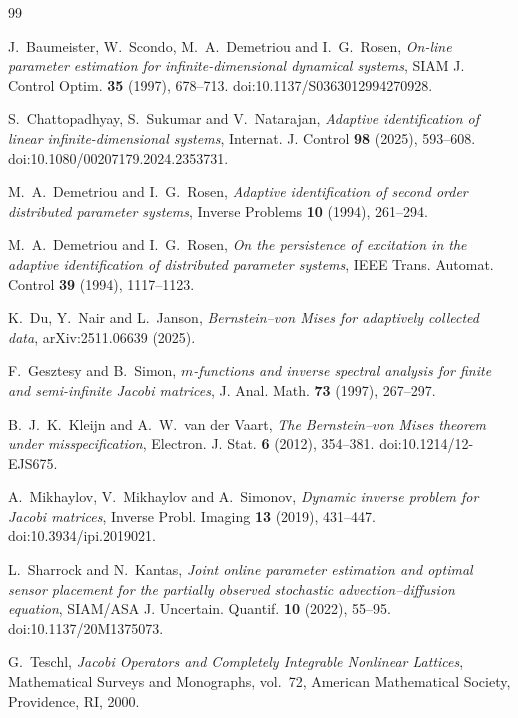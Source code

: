 
\begin{thebibliography}{99}

J.~Baumeister, W.~Scondo, M.~A.~Demetriou and I.~G.~Rosen,
\emph{On-line parameter estimation for infinite-dimensional dynamical
systems},
SIAM J. Control Optim. \textbf{35} (1997), 678--713.
doi:10.1137/S0363012994270928.

S.~Chattopadhyay, S.~Sukumar and V.~Natarajan,
\emph{Adaptive identification of linear infinite-dimensional systems},
Internat. J. Control \textbf{98} (2025), 593--608.
doi:10.1080/00207179.2024.2353731.

M.~A.~Demetriou and I.~G.~Rosen,
\emph{Adaptive identification of second order distributed parameter
systems},
Inverse Problems \textbf{10} (1994), 261--294.

M.~A.~Demetriou and I.~G.~Rosen,
\emph{On the persistence of excitation in the adaptive identification of
distributed parameter systems},
IEEE Trans. Automat. Control \textbf{39} (1994), 1117--1123.

K.~Du, Y.~Nair and L.~Janson,
\emph{Bernstein--von Mises for adaptively collected data},
arXiv:2511.06639 (2025).

F.~Gesztesy and B.~Simon,
\emph{\(m\)-functions and inverse spectral analysis for finite and
semi-infinite Jacobi matrices},
J. Anal. Math. \textbf{73} (1997), 267--297.

B.~J.~K.~Kleijn and A.~W.~van der Vaart,
\emph{The Bernstein--von Mises theorem under misspecification},
Electron. J. Stat. \textbf{6} (2012), 354--381.
doi:10.1214/12-EJS675.

A.~Mikhaylov, V.~Mikhaylov and A.~Simonov,
\emph{Dynamic inverse problem for Jacobi matrices},
Inverse Probl. Imaging \textbf{13} (2019), 431--447.
doi:10.3934/ipi.2019021.

L.~Sharrock and N.~Kantas,
\emph{Joint online parameter estimation and optimal sensor placement for the
partially observed stochastic advection--diffusion equation},
SIAM/ASA J. Uncertain. Quantif. \textbf{10} (2022), 55--95.
doi:10.1137/20M1375073.

G.~Teschl,
\emph{Jacobi Operators and Completely Integrable Nonlinear Lattices},
Mathematical Surveys and Monographs, vol.~72,
American Mathematical Society, Providence, RI, 2000.

\end{thebibliography}
